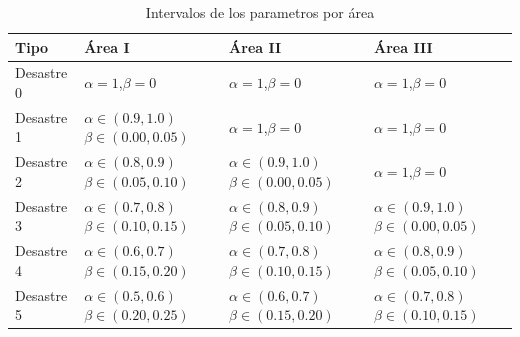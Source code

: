 \documentclass[letter, 10pt]{article}
\begin{document}
\begin{table}[H]
\centering
\begin{tabular}{|l|l|l|l|}
\hline
Tipo & Área I & Área II & Área III \\ \hline
Desastre 0 & $\alpha=1$,$\beta=0$ & $\alpha=1$,$\beta=0$ & $\alpha=1$,$\beta=0$ \\ \hline
Desastre 1 & $\alpha \in (0.9,1.0)$ $\beta \in (0.00,0.05)$ & $\alpha=1$,$\beta=0$ & $\alpha=1$,$\beta=0$ \\ \hline
Desastre 2 & $\alpha \in (0.8,0.9)$ $\beta \in (0.05,0.10)$ & $\alpha \in (0.9,1.0)$ $\beta \in (0.00,0.05)$ & $\alpha=1$,$\beta=0$ \\ \hline
Desastre 3 & $\alpha \in (0.7,0.8)$ $\beta \in (0.10,0.15)$ & $\alpha \in (0.8,0.9)$ $\beta \in (0.05,0.10)$ & $\alpha \in (0.9,1.0)$ $\beta \in (0.00,0.05)$ \\ \hline
Desastre 4 & $\alpha \in (0.6,0.7)$ $\beta \in (0.15,0.20)$ & $\alpha \in (0.7,0.8)$ $\beta \in (0.10,0.15)$ & $\alpha \in (0.8,0.9)$ $\beta \in (0.05,0.10)$ \\ \hline
Desastre 5 & $\alpha \in (0.5,0.6)$ $\beta \in (0.20,0.25)$ & $\alpha \in (0.6,0.7)$ $\beta \in (0.15,0.20)$ &  $\alpha \in (0.7,0.8)$  $\beta \in (0.10,0.15)$\\ \hline
\end{tabular}
\caption{Intervalos de los parametros por área}\label{table:intervalo}
\end{table}
\end{document}
